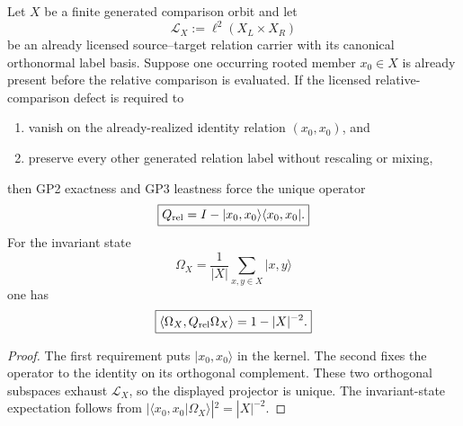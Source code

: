 \documentclass[12pt,a4paper]{article}
\begin{document}
\begin{theorem}
\label{p2a:thm:v3104-rooted-identity-channel-reduction}
Let $X$ be a finite generated comparison orbit and let
\[
 \mathcal L_X:=\ell^2(X_L\times X_R)
\]
be an already licensed source--target relation carrier with its canonical
orthonormal label basis.  Suppose one occurring rooted member $x_0\in X$ is
already present before the relative comparison is evaluated.  If the licensed
relative-comparison defect is required to
\begin{enumerate}
\item vanish on the already-realized identity relation $(x_0,x_0)$, and
\item preserve every other generated relation label without rescaling or
mixing,
\end{enumerate}
then GP2 exactness and GP3 leastness force the unique operator
\[
 \boxed{Q_{\rm rel}=I-|x_0,x_0\rangle\langle x_0,x_0|.}
\]
For the invariant state
\[
 \Omega_X=\frac1{|X|}\sum_{x,y\in X}|x,y\rangle
\]
one has
\[
 \boxed{\langle\Omega_X,Q_{\rm rel}\Omega_X\rangle
 =1-|X|^{-2}.}
\]
\end{theorem}
\begin{proof}
The first requirement puts $|x_0,x_0\rangle$ in the kernel.  The second fixes
the operator to the identity on its orthogonal complement.  These two
orthogonal subspaces exhaust $\mathcal L_X$, so the displayed projector is
unique.  The invariant-state expectation follows from
$|\langle x_0,x_0|\Omega_X\rangle|^2=|X|^{-2}$.
\end{proof}
\end{document}
